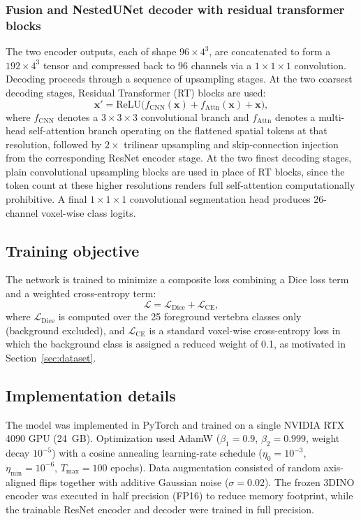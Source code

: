 \documentclass[preprint,12pt,3p]{elsarticle}
\begin{document}
\subsubsection{Fusion and NestedUNet decoder with residual transformer blocks}
The two encoder outputs, each of shape $96 \times 4^3$, are concatenated to form a $192 \times 4^3$ tensor and compressed back to 96 channels via a $1\times1\times1$ convolution. Decoding proceeds through a sequence of upsampling stages. At the two coarsest decoding stages, Residual Transformer (RT) blocks are used:
\begin{equation}
\mathbf{x}' = \mathrm{ReLU}\big( f_{\mathrm{CNN}}(\mathbf{x}) + f_{\mathrm{Attn}}(\mathbf{x}) + \mathbf{x} \big),
\label{eq:rtblock}
\end{equation}
where $f_{\mathrm{CNN}}$ denotes a $3\times3\times3$ convolutional branch and $f_{\mathrm{Attn}}$ denotes a multi-head self-attention branch operating on the flattened spatial tokens at that resolution, followed by $2\times$ trilinear upsampling and skip-connection injection from the corresponding ResNet encoder stage. At the two finest decoding stages, plain convolutional upsampling blocks are used in place of RT blocks, since the token count at these higher resolutions renders full self-attention computationally prohibitive. A final $1\times1\times1$ convolutional segmentation head produces 26-channel voxel-wise class logits.

\subsection{Training objective}
The network is trained to minimize a composite loss combining a Dice loss term and a weighted cross-entropy term:
\begin{equation}
\mathcal{L} = \mathcal{L}_{\mathrm{Dice}} + \mathcal{L}_{\mathrm{CE}},
\label{eq:loss}
\end{equation}
where $\mathcal{L}_{\mathrm{Dice}}$ is computed over the 25 foreground vertebra classes only (background excluded), and $\mathcal{L}_{\mathrm{CE}}$ is a standard voxel-wise cross-entropy loss in which the background class is assigned a reduced weight of 0.1, as motivated in Section~\ref{sec:dataset}.

\subsection{Implementation details}
The model was implemented in PyTorch and trained on a single NVIDIA RTX 4090 GPU (24~GB). Optimization used AdamW ($\beta_1 = 0.9$, $\beta_2 = 0.999$, weight decay $10^{-5}$) with a cosine annealing learning-rate schedule ($\eta_0 = 10^{-3}$, $\eta_{\min} = 10^{-6}$, $T_{\max} = 100$ epochs). Data augmentation consisted of random axis-aligned flips together with additive Gaussian noise ($\sigma = 0.02$). The frozen 3DINO encoder was executed in half precision (FP16) to reduce memory footprint, while the trainable ResNet encoder and decoder were trained in full precision.
\end{document}
